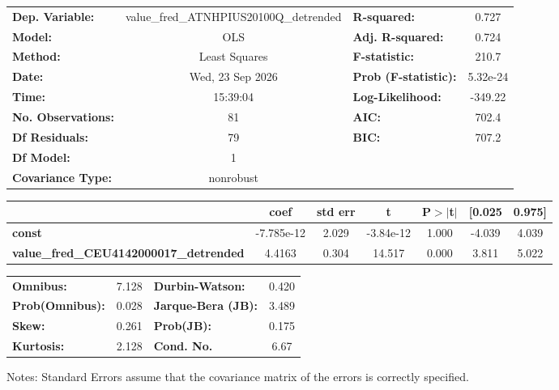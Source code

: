 \begin{center}
\begin{tabular}{lclc}
\toprule
\textbf{Dep. Variable:}                        & value\_fred\_ATNHPIUS20100Q\_detrended & \textbf{  R-squared:         } &     0.727   \\
\textbf{Model:}                                &                  OLS                   & \textbf{  Adj. R-squared:    } &     0.724   \\
\textbf{Method:}                               &             Least Squares              & \textbf{  F-statistic:       } &     210.7   \\
\textbf{Date:}                                 &            Wed, 23 Sep 2026            & \textbf{  Prob (F-statistic):} &  5.32e-24   \\
\textbf{Time:}                                 &                15:39:04                & \textbf{  Log-Likelihood:    } &   -349.22   \\
\textbf{No. Observations:}                     &                     81                 & \textbf{  AIC:               } &     702.4   \\
\textbf{Df Residuals:}                         &                     79                 & \textbf{  BIC:               } &     707.2   \\
\textbf{Df Model:}                             &                      1                 & \textbf{                     } &             \\
\textbf{Covariance Type:}                      &               nonrobust                & \textbf{                     } &             \\
\bottomrule
\end{tabular}
\begin{tabular}{lcccccc}
                                               & \textbf{coef} & \textbf{std err} & \textbf{t} & \textbf{P$> |$t$|$} & \textbf{[0.025} & \textbf{0.975]}  \\
\midrule
\textbf{const}                                 &   -7.785e-12  &        2.029     & -3.84e-12  &         1.000        &       -4.039    &        4.039     \\
\textbf{value\_fred\_CEU4142000017\_detrended} &       4.4163  &        0.304     &    14.517  &         0.000        &        3.811    &        5.022     \\
\bottomrule
\end{tabular}
\begin{tabular}{lclc}
\textbf{Omnibus:}       &  7.128 & \textbf{  Durbin-Watson:     } &    0.420  \\
\textbf{Prob(Omnibus):} &  0.028 & \textbf{  Jarque-Bera (JB):  } &    3.489  \\
\textbf{Skew:}          &  0.261 & \textbf{  Prob(JB):          } &    0.175  \\
\textbf{Kurtosis:}      &  2.128 & \textbf{  Cond. No.          } &     6.67  \\
\bottomrule
\end{tabular}
\end{center}

Notes: \newline
 [1] Standard Errors assume that the covariance matrix of the errors is correctly specified.